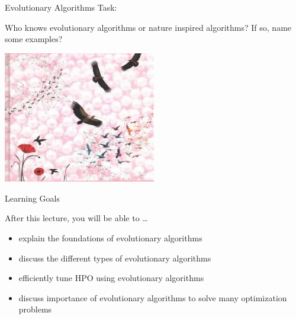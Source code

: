 \begin{frame}{Evolutionary Algorithms}
Task: \hands [2min] \linebreak

Who knows evolutionary algorithms or nature inspired algorithms? If so, name some examples? 
\begin{center}
\includegraphics[width=0.5\textwidth]{new_images/EAs_02.png}
\end{center}

\end{frame}

\begin{frame}[c]{Learning Goals}

After this lecture, you will be able to \ldots

\begin{itemize}
	\item explain the foundations of \alert{evolutionary algorithms}
	\item discuss the \alert{different types of evolutionary algorithms}
	\item efficiently tune \alert{HPO using evolutionary algorithms}
	\item discuss importance of \alert{evolutionary algorithms to solve many optimization problems}
\end{itemize}

\end{frame}



